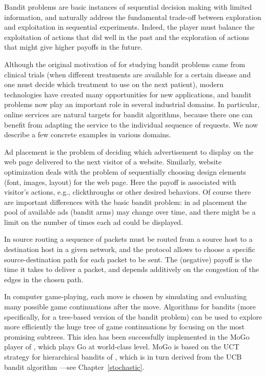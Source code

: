 \documentclass[11pt]{hackednow}
\begin{document}
Bandit problems are basic instances of sequential decision making with limited information, and naturally address the fundamental trade-off between exploration and exploitation in sequential experiments. Indeed, the player must balance the exploitation of actions that did well in the past and the exploration of actions that might give higher payoffs in the future.

Although the original motivation of \cite{Tho33} for studying bandit problems came from clinical trials (when different treatments are available for a certain disease and one must decide which treatment to use on the next patient), modern technologies have created many opportunities for new applications, and bandit problems now play an important role in several industrial domains. In particular, online services are natural targets for bandit algorithms, because there one can benefit from adapting the service to the individual sequence of requests. We now describe a few concrete examples in various domains.

Ad placement is the problem of deciding which advertisement to display on the web page delivered to the next visitor of a website. Similarly, website optimization deals with the problem of sequentially choosing design elements (font, images, layout) for the web page. Here the payoff is associated with visitor's actions, e.g., clickthroughs or other desired behaviors. Of course there are important differences with the basic bandit problem: in ad placement the pool of available ads (bandit arms) may change over time, and there might be a limit on the number of times each ad could be displayed.

In source routing a sequence of packets must be routed from a source host to a destination host in a given network, and the protocol allows to choose a specific source-destination path for each packet to be sent. The (negative) payoff is the time it takes to deliver a packet, and depends additively on the congestion of the edges in the chosen path.

In computer game-playing, each move is chosen by simulating and evaluating many possible game continuations after the move. Algorithms for bandits (more specifically, for a tree-based version of the bandit problem) can be used to explore more efficiently the huge tree of game continuations by focusing on the most promising subtrees. This idea has been successfully implemented in the MoGo player of \cite{GWMT06}, which plays Go at world-class level. MoGo is based on the UCT strategy for hierarchical bandits of \cite{KS06}, which is in turn derived from the UCB bandit algorithm ---see Chapter~\ref{stochastic}.
\end{document}
